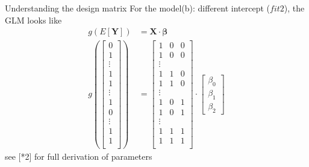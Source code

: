 \documentclass[10pt]{beamer}
\begin{document}
\begin{frame}[fragile]{Understanding the design matrix}
For the model(b): different intercept ($fit2$), the GLM looks like 
\begin{align*}
g(E[\mathbf{Y}]) &= \mathbf{X} \cdot \mathbf{\beta}\\
    g( 
    \begin{bmatrix}
           0 \\
           1 \\
           \vdots \\
           1 \\
           1 \\
           \vdots \\
           1 \\
           0 \\
           \vdots \\
           1 \\
           1 \\
    \end{bmatrix} ) &= 
    \begin{bmatrix}
           1 & 0 & 0 \\
           1 & 0  & 0 \\
           \vdots \\
           1 & 1 & 0 \\
           1 & 1 & 0 \\
           \vdots \\
           1 & 0 & 1 \\
           1 & 0 & 1 \\
           \vdots \\
           1 & 1 & 1 \\
           1 & 1 & 1 \\
    \end{bmatrix} \cdot
    \begin{bmatrix}
           \beta_0 \\
           \beta_1 \\
           \beta_2 
    \end{bmatrix}
\end{align*}
{\small \hfill see [*2] for full derivation of parameters}
\end{frame}
\end{document}
